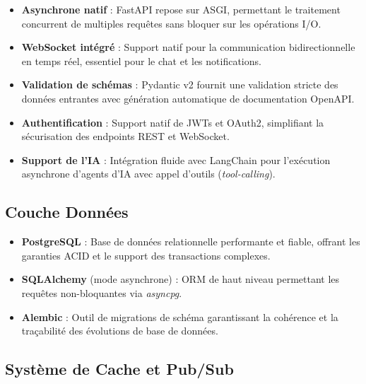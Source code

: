 \begin{itemize}
    \item \textbf{Asynchrone natif} : \Gls{FastAPI} repose sur \gls{ASGI}, permettant le traitement concurrent de multiples requêtes sans bloquer sur les opérations I/O.

    \item \textbf{WebSocket intégré} : Support natif pour la communication bidirectionnelle en temps réel, essentiel pour le chat et les notifications.

    \item \textbf{Validation de schémas} : \Gls{Pydantic} v2 fournit une validation stricte des données entrantes avec génération automatique de documentation \gls{OpenAPI}.

    \item \textbf{Authentification} : Support natif de \glspl{JWT} et \gls{OAuth2}, simplifiant la sécurisation des endpoints \gls{REST} et WebSocket.

    \item \textbf{Support de l'IA} : Intégration fluide avec \gls{LangChain} pour l'exécution asynchrone d'agents d'\gls{IA} avec appel d'outils (\textit{tool-calling}).
\end{itemize}

\subsection{Couche Données}

\begin{itemize}
    \item \textbf{\Gls{PostgreSQL}} : Base de données relationnelle performante et fiable, offrant les garanties ACID et le support des transactions complexes.

    \item \textbf{\Gls{SQLAlchemy}} (mode asynchrone) : \gls{ORM} de haut niveau permettant les requêtes non-bloquantes via \textit{asyncpg}.

    \item \textbf{\Gls{Alembic}} : Outil de migrations de schéma garantissant la cohérence et la traçabilité des évolutions de base de données.
\end{itemize}

\subsection{Système de Cache et Pub/Sub}

